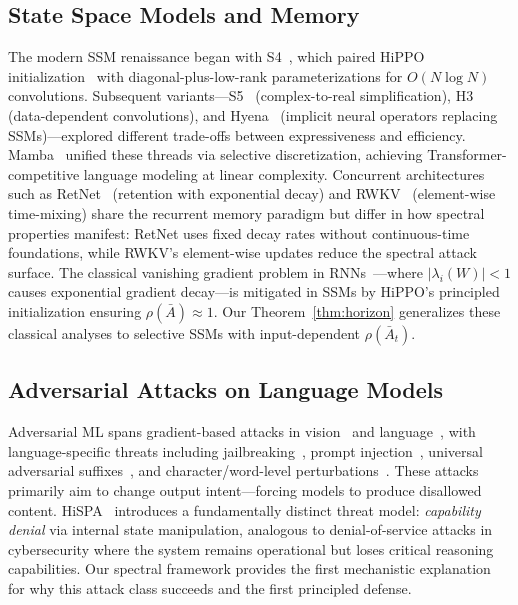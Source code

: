 \documentclass[10pt,twocolumn]{article}
\begin{document}
\subsection{State Space Models and Memory}

The modern SSM renaissance began with S4~\cite{gu2021efficiently}, which paired HiPPO initialization~\cite{gu2020hippo} with diagonal-plus-low-rank parameterizations for $O(N\log N)$ convolutions. Subsequent variants---S5~\cite{smith2023s5} (complex-to-real simplification), H3~\cite{dao2022hungry} (data-dependent convolutions), and Hyena~\cite{poli2023hyena} (implicit neural operators replacing SSMs)---explored different trade-offs between expressiveness and efficiency. Mamba~\cite{gu2023mamba} unified these threads via selective discretization, achieving Transformer-competitive language modeling at linear complexity. Concurrent architectures such as RetNet~\cite{sun2023retentive} (retention with exponential decay) and RWKV~\cite{peng2023rwkv} (element-wise time-mixing) share the recurrent memory paradigm but differ in how spectral properties manifest: RetNet uses fixed decay rates without continuous-time foundations, while RWKV's element-wise updates reduce the spectral attack surface. The classical vanishing gradient problem in RNNs~\cite{bengio1994learning,hochreiter1997lstm}---where $|\lambda_i(W)|<1$ causes exponential gradient decay---is mitigated in SSMs by HiPPO's principled initialization ensuring $\rho(\bar{A})\approx 1$. Our Theorem~\ref{thm:horizon} generalizes these classical analyses to selective SSMs with input-dependent $\rho(\bar{A}_t)$.

\subsection{Adversarial Attacks on Language Models}

Adversarial ML spans gradient-based attacks in vision~\cite{goodfellow2014adversarial,madry2018towards} and language~\cite{wallace2019universal,zou2023universal}, with language-specific threats including jailbreaking~\cite{liu2023jailbreak,wei2023jailbroken}, prompt injection~\cite{perez2022red,greshake2023not}, universal adversarial suffixes~\cite{zou2023universal}, and character/word-level perturbations~\cite{ebrahimi2018hotflip,gao2018black}. These attacks primarily aim to change output intent---forcing models to produce disallowed content. HiSPA~\cite{lemercier2026hispa} introduces a fundamentally distinct threat model: \emph{capability denial} via internal state manipulation, analogous to denial-of-service attacks in cybersecurity where the system remains operational but loses critical reasoning capabilities. Our spectral framework provides the first mechanistic explanation for why this attack class succeeds and the first principled defense.
\end{document}
